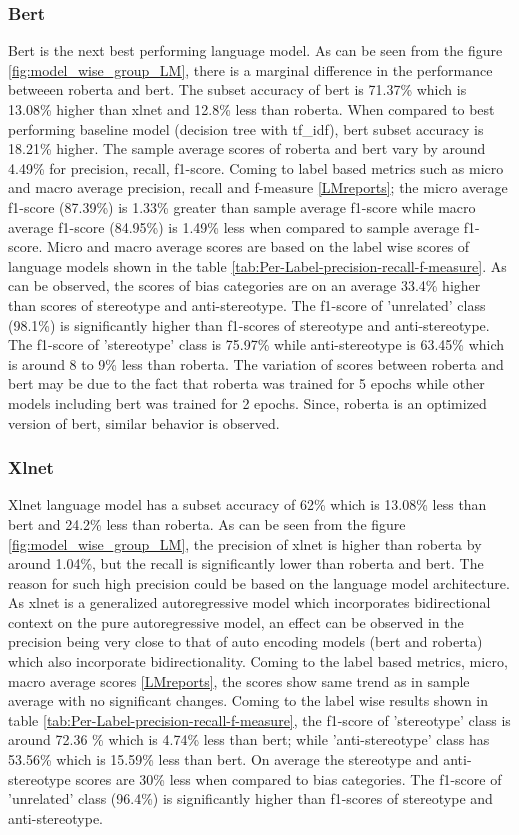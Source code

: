 \subsubsection{Bert}
Bert is the next best performing language model. As can be seen from the figure \ref{fig:model_wise_group_LM}, there is a marginal difference in the performance betweeen roberta and bert. The subset accuracy of bert is 71.37\% which is 13.08\% higher than xlnet and 12.8\% less than roberta. When compared to best performing baseline model (decision tree with tf\_idf), bert subset accuracy is 18.21\% higher. The sample average scores of roberta and bert vary by around 4.49\% for precision, recall, f1-score. Coming to label based metrics such as micro and macro average precision, recall and f-measure \ref{LMreports}; the micro  average f1-score (87.39\%)  is 1.33\% greater than sample average f1-score while macro average f1-score (84.95\%) is 1.49\% less when compared to sample average f1-score. Micro and macro average scores are based on the label wise scores of language models shown in the table \ref{tab:Per-Label-precision-recall-f-measure}. As can be observed, the scores of bias categories are on an average 33.4\% higher than scores of stereotype and anti-stereotype. The f1-score of 'unrelated' class (98.1\%) is significantly higher than f1-scores of stereotype and anti-stereotype. The f1-score of 'stereotype' class is 75.97\% while anti-stereotype is 63.45\% which is around 8 to 9\% less than roberta. The variation of scores between roberta and bert may be due to the fact that roberta was trained for 5 epochs while other models including bert was trained for 2 epochs. Since, roberta is an optimized version of bert, similar behavior is observed. 

\subsubsection{Xlnet}
Xlnet language model has a subset accuracy of 62\% which is 13.08\% less than bert and 24.2\% less than roberta. As can be seen from the figure \ref{fig:model_wise_group_LM}, the precision of xlnet is higher than roberta by around 1.04\%, but the recall is significantly lower than roberta and bert. The reason for such high precision could be based on the language model architecture. As xlnet is a generalized autoregressive model which incorporates bidirectional context on the pure autoregressive model, an effect can be observed in the precision being very close to that of auto encoding models (bert and roberta) which also incorporate bidirectionality.  Coming to the label based metrics, micro, macro average scores \ref{LMreports}, the scores show same trend as in sample average with no significant changes. Coming to the label wise results shown in table \ref{tab:Per-Label-precision-recall-f-measure}, the f1-score of 'stereotype' class is around 72.36 \%  which is 4.74\% less than bert; while 'anti-stereotype' class has 53.56\% which is 15.59\% less than bert. On average the stereotype and anti-stereotype scores are 30\% less when compared to bias categories. The f1-score of 'unrelated' class (96.4\%) is significantly higher than f1-scores of stereotype and anti-stereotype.

